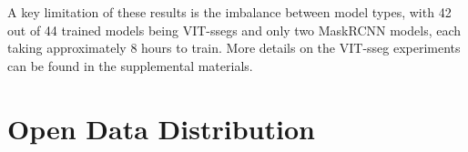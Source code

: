 \documentclass{article}
\newcommand{\cotwo}{\ensuremath{\mathrm{CO_2}}}
\begin{document}
A key limitation of these results is the imbalance between model types, with 42 out of 44 trained models
  being VIT-ssegs and only two MaskRCNN models, each taking approximately 8 hours to train.
More details on the VIT-sseg experiments can be found in the supplemental materials.
  








\section{Open Data Distribution}
\label{sec:distribution}

  


\end{document}
